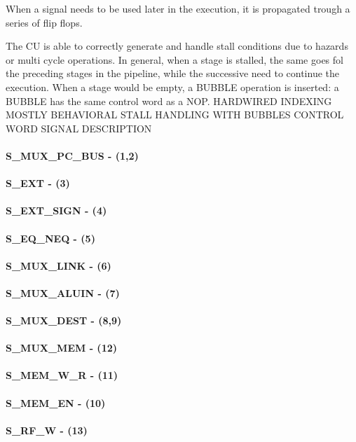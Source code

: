 \documentclass[12pt]{article}
\begin{document}
When a signal needs to be used later in the execution, it is propagated trough a series of flip flops.

The CU is able to correctly generate and handle stall conditions due to hazards or multi cycle operations. In general, when a stage is stalled, the same goes fol the preceding stages in the pipeline, while the successive need to continue the execution. When a stage would be empty, a BUBBLE operation is inserted: a BUBBLE has the same control word as a NOP.
HARDWIRED
INDEXING
MOSTLY BEHAVIORAL
STALL HANDLING WITH BUBBLES
CONTROL WORD SIGNAL DESCRIPTION
\paragraph{S\_MUX\_PC\_BUS - (1,2)}
\paragraph{S\_EXT - (3)}
\paragraph{S\_EXT\_SIGN - (4)}
\paragraph{S\_EQ\_NEQ - (5)}
\paragraph{S\_MUX\_LINK - (6)}
\paragraph{S\_MUX\_ALUIN - (7)}
\paragraph{S\_MUX\_DEST - (8,9)}
\paragraph{S\_MUX\_MEM - (12)}
\paragraph{S\_MEM\_W\_R - (11)}
\paragraph{S\_MEM\_EN - (10)}
\paragraph{S\_RF\_W - (13)}
\end{document}
